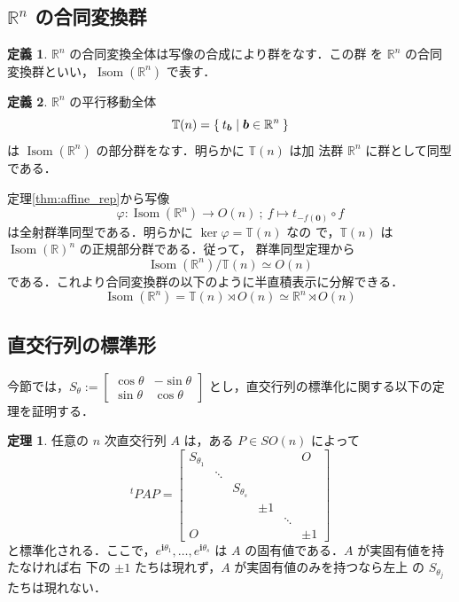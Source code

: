 \documentclass[11pt, uplatex, dvipdfmx, titlepage]{jsarticle}
\renewcommand{\i}{\mathbf{i}}
\DeclareMathOperator{\Isom}{Isom}
\theoremstyle{definition}
\newtheorem{theorem}{定理}[section]
\newtheorem*{definition}{定義}
\begin{document}
\subsection{$\mathbb{R}^n$ の合同変換群}

\begin{definition}
  $\mathbb{R}^n$ の合同変換全体は写像の合成により群をなす．この群
  を $\mathbb{R}^n$ の合同変換群といい，$\Isom(\mathbb{R}^n)$ で表す．
\end{definition}

\begin{definition}
  $\mathbb{R}^n$ の平行移動全体
  \[
    \mathbb{T}(n)=\Set{ t_{\bm{b}} | \bm{b} \in \mathbb{R}^n}
  \]
  は $\Isom(\mathbb{R}^n)$ の部分群をなす．明らかに $\mathbb{T}(n)$ は加
  法群 $\mathbb{R}^n$ に群として同型である．
\end{definition}


定理\ref{thm:affine_rep}から写像
\[
  \varphi : \Isom(\mathbb{R}^n) \to O(n) \ ; \ f \mapsto t_{-f(\bm{0})} \circ f
\]
は全射群準同型である．明らかに $\ker \varphi = \mathbb{T}(n)$ なの
で，$\mathbb{T}(n)$ は $\Isom(\mathbb{R})^n$ の正規部分群である．従って，
群準同型定理から
\[
  \Isom(\mathbb{R}^n)/\mathbb{T}(n) \simeq O(n)
\]
である．これより合同変換群の以下のように半直積表示に分解できる．
\[
  \Isom(\mathbb{R}^n) = \mathbb{T}(n) \rtimes O(n) \simeq \mathbb{R}^n \rtimes O(n)
\]

\subsection{直交行列の標準形}

今節では，$S_{\theta}:=\left[
    \begin{array}{rr}
      \cos \theta & -\sin \theta\\
      \sin \theta & \cos \theta
    \end{array}
  \right]$ とし，直交行列の標準化に関する以下の定理を証明する．

  \begin{theorem}\label{thm:stdform}
    任意の $n$ 次直交行列 $A$ は，ある $P \in SO(n)$ によって 
    \begin{equation}\label{eq:std}
      {}^{t}PAP = \left[
        \begin{array}{cccccc}
          S_{\theta_1} & & & & & O\\
                       & \ddots & & & & \\
                       & & S_{\theta_s} & & &\\
                       & & & \pm 1 & &\\
                       & & & & \ddots &\\
          O & & & & & \pm 1
        \end{array}
      \right]
    \end{equation}
    と標準化される．ここで，$e^{\i \theta_1}, \ldots,
    e^{\i\theta_s}$ は $A$ の固有値である．$A$ が実固有値を持たなければ右
    下の $\pm 1$ たちは現れず，$A$ が実固有値のみを持つなら左上
    の $S_{\theta_j}$ たちは現れない．
  \end{theorem}
\end{document}
